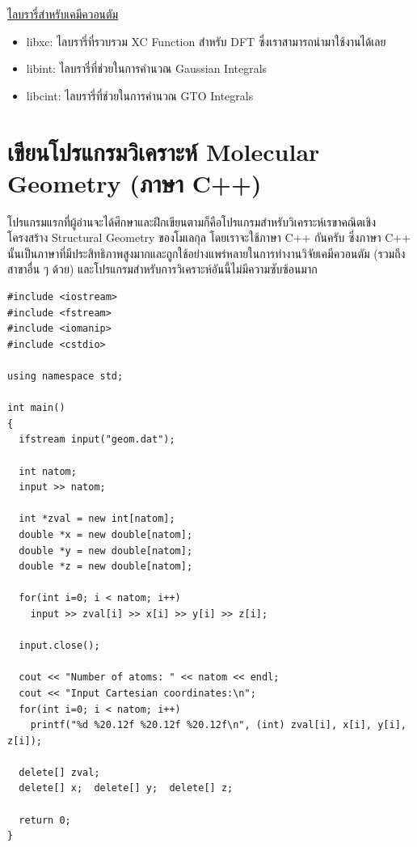 \noindent \underline{ไลบรารี่สำหรับเคมีควอนตัม}

\begin{itemize}[topsep=0pt]
  \item libxc: ไลบรารี่ที่รวบรวม XC Function สำหรับ DFT ซึ่งเราสามารถนำมาใช้งานได้เลย

  \item libint: ไลบรารี่ที่ช่วยในการคำนวณ Gaussian Integrals

  \item libcint: ไลบรารี่ที่ช่วยในการคำนวณ GTO Integrals
\end{itemize}

\section{เขียนโปรแกรมวิเคราะห์ Molecular Geometry (ภาษา C++)}

โปรแกรมแรกที่ผู้อ่านจะได้ศึกษาและฝึกเขียนตามก็คือโปรแกรมสำหรับวิเคราะห์เรขาคณิตเชิงโครงสร้าง Structural Geometry ของโมเลกุล
โดยเราจะใช้ภาษา C++ กันครับ ซึ่งภาษา C++ นั้นเป็นภาษาที่มีประสิทธิภาพสูงมากและถูกใช้อย่างแพร่หลายในการทำงานวิจัยเคมีควอนตัม
(รวมถึงสาขาอื่น ๆ ด้วย) และโปรแกรมสำหรับการวิเคราะห์อันนี้ไม่มีความซับซ้อนมาก

\noindent {}

\vspace{5pt}

\begin{lstlisting}[style=MyC++]
#include <iostream>
#include <fstream>
#include <iomanip>
#include <cstdio>

using namespace std;

int main() 
{
  ifstream input("geom.dat");

  int natom;
  input >> natom;

  int *zval = new int[natom];
  double *x = new double[natom];
  double *y = new double[natom];
  double *z = new double[natom];

  for(int i=0; i < natom; i++)
    input >> zval[i] >> x[i] >> y[i] >> z[i];
  
  input.close();

  cout << "Number of atoms: " << natom << endl;
  cout << "Input Cartesian coordinates:\n";
  for(int i=0; i < natom; i++)
    printf("%d %20.12f %20.12f %20.12f\n", (int) zval[i], x[i], y[i], z[i]);

  delete[] zval;
  delete[] x;  delete[] y;  delete[] z;

  return 0;
}
\end{lstlisting}

